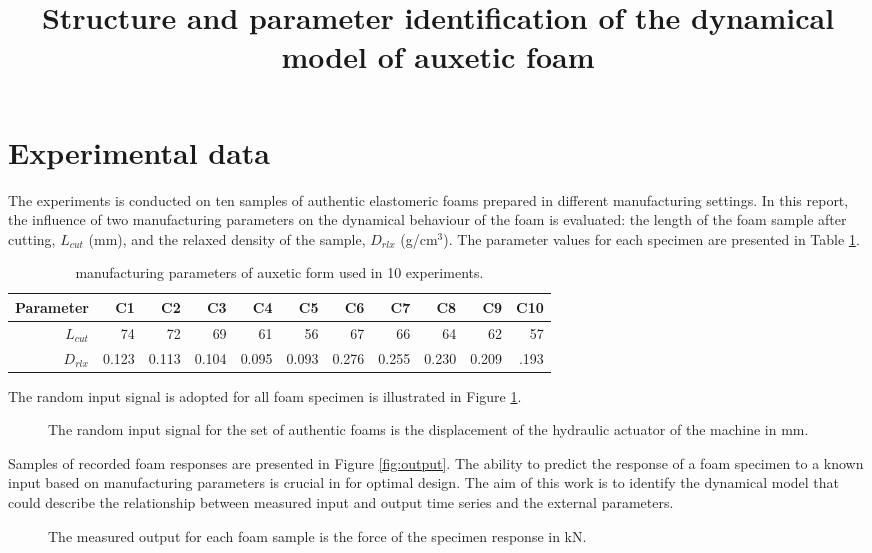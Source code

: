 \documentclass[a4paper,11pt,twoside]{article}
\title{Structure and parameter identification of the dynamical model of auxetic foam}
\theoremstyle{mytheoremstyle}
\begin{document}
	\maketitle
%	
\section{Experimental data}
\par The experiments is conducted on ten samples of authentic elastomeric foams prepared in different manufacturing settings. In this report, the influence of two manufacturing parameters on the dynamical behaviour of the foam is evaluated: the length of the foam sample after cutting, $L_{cut}$ (mm), and the relaxed density of the sample, $D_{rlx}$ (g/cm$^3$). The parameter values for each specimen are presented in Table \ref{tab:externparams}.
\begin{table}[!h]
	\centering
	\caption{manufacturing parameters of auxetic form used in 10 experiments.}\label{tab:externparams}
	\small
	\begin{tabular}{rrrrrrrrrrr}
		Parameter  & C1 & C2 & C3 & C4 & C5 & C6 & C7 & C8 & C9 & C10 \\ 
		\hline 
		$L_{cut}$ & 74 & 72 & 69 & 61 & 56 & 67 & 66 & 64 & 62 & 57 \\ 
		$D_{rlx}$ & 0.123 & 0.113 & 0.104 & 0.095 & 0.093 & 0.276 & 0.255 & 0.230 & 0.209 & .193 \\ 
		\hline 
	\end{tabular}
\end{table}
The random input signal is adopted for all foam specimen is illustrated in Figure \ref{fig:input}. 
\begin{figure}[!h]
	\centering
	
	\caption{The random input signal for the set of authentic foams is the displacement of the hydraulic actuator of the machine in mm.}\label{fig:input}
\end{figure}
Samples of recorded foam responses are presented in  Figure \ref{fig:output}. The ability to predict the response of a foam specimen to a known input based on manufacturing parameters is crucial in for optimal design. The aim of this work is to identify the dynamical model that could describe the relationship between measured input and output time series and the external parameters.	
\begin{figure}[!h]
	\centering
	
	\caption{The measured output for each foam sample is the force of the specimen response in kN.}
\end{figure}\label{fig:output}
\end{document}

